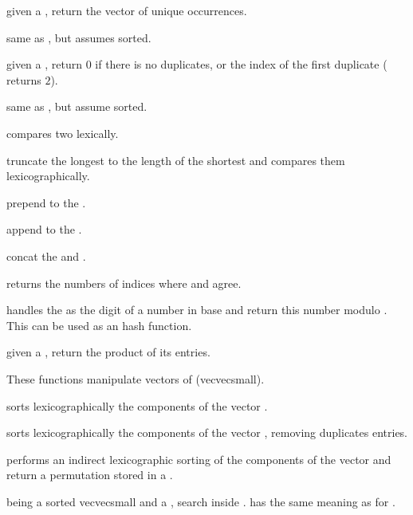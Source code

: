  given a  , return
the vector of unique occurrences.

 same as , but assumes
  sorted.

 given a  , return
$0$ if there is no duplicates, or the index of the first duplicate
( returns $2$).

 same as
, but assume  sorted.

 compares two  lexically.

 truncate the longest 
to the length of the shortest and compares them lexicographically.

 prepend  to the
 .

 append  to the
 .

 concat the  
and .

 returns the numbers of indices
where  and  agree.

 handles the
  as the digit of a number in base  and return
this number modulo . This can be used as an hash function.

 given a  , return
the product of its entries.

These functions manipulate vectors of  (vecvecsmall).

 sorts lexicographically the components of
the vector .

 sorts lexicographically the components of
the vector , removing duplicates entries.

 performs an indirect lexicographic
sorting of the components of the vector  and return a permutation
stored in a .

  being a sorted
vecvecsmall and  a , search  inside .
 has the same meaning as for .

